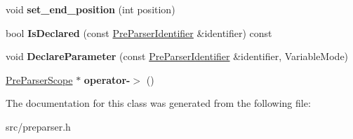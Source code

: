 \begin{DoxyCompactItemize}
\item 
\hypertarget{classv8_1_1internal_1_1_pre_parser_scope_a5034fbeb5339679d4679c84fb377cd83}{}void {\bfseries set\+\_\+end\+\_\+position} (int position)\label{classv8_1_1internal_1_1_pre_parser_scope_a5034fbeb5339679d4679c84fb377cd83}

\item 
\hypertarget{classv8_1_1internal_1_1_pre_parser_scope_a637aeebc81043e0c86f9f107560364d7}{}bool {\bfseries Is\+Declared} (const \hyperlink{classv8_1_1internal_1_1_pre_parser_identifier}{Pre\+Parser\+Identifier} \&identifier) const \label{classv8_1_1internal_1_1_pre_parser_scope_a637aeebc81043e0c86f9f107560364d7}

\item 
\hypertarget{classv8_1_1internal_1_1_pre_parser_scope_a81e3b2476111122adfe66bef44b49f34}{}void {\bfseries Declare\+Parameter} (const \hyperlink{classv8_1_1internal_1_1_pre_parser_identifier}{Pre\+Parser\+Identifier} \&identifier, Variable\+Mode)\label{classv8_1_1internal_1_1_pre_parser_scope_a81e3b2476111122adfe66bef44b49f34}

\item 
\hypertarget{classv8_1_1internal_1_1_pre_parser_scope_a72df30a244fb220177a80e0b036ea254}{}\hyperlink{classv8_1_1internal_1_1_pre_parser_scope}{Pre\+Parser\+Scope} $\ast$ {\bfseries operator-\/$>$} ()\label{classv8_1_1internal_1_1_pre_parser_scope_a72df30a244fb220177a80e0b036ea254}

\end{DoxyCompactItemize}


The documentation for this class was generated from the following file\+:\begin{DoxyCompactItemize}
\item 
src/preparser.\+h\end{DoxyCompactItemize}
